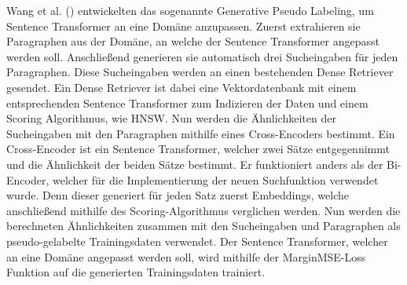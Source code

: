 Wang et al. (\citeyear{Wang_Thakur_Reimers_Gurevych_2022}) entwickelten das sogenannte Generative Pseudo Labeling, um Sentence Transformer an eine Domäne anzupassen.
Zuerst extrahieren sie Paragraphen aus der Domäne, an welche der Sentence Transformer angepasst werden soll.
Anschließend generieren sie automatisch drei Sucheingaben für jeden Paragraphen.
Diese Sucheingaben werden an einen bestehenden Dense Retriever gesendet.
Ein Dense Retriever ist dabei eine Vektordatenbank mit einem entsprechenden Sentence Transformer zum Indizieren der Daten und einem Scoring Algorithmus, wie HNSW. 
Nun werden die Ähnlichkeiten der Sucheingaben mit den Paragraphen mithilfe eines Cross-Encoders bestimmt.
Ein Cross-Encoder ist ein Sentence Transformer, welcher zwei Sätze entgegennimmt und die Ähnlichkeit der beiden Sätze bestimmt.
Er funktioniert anders als der Bi-Encoder, welcher für die Implementierung der neuen Suchfunktion verwendet wurde.
Denn dieser generiert für jeden Satz zuerst Embeddings, welche anschließend mithilfe des Scoring-Algorithmus verglichen werden.
Nun werden die berechneten Ähnlichkeiten zusammen mit den Sucheingaben und Paragraphen als pseudo-gelabelte Trainingsdaten verwendet.
Der Sentence Transformer, welcher an eine Domäne angepasst werden soll, wird mithilfe der MarginMSE-Loss Funktion auf die generierten Trainingsdaten trainiert.\\  

